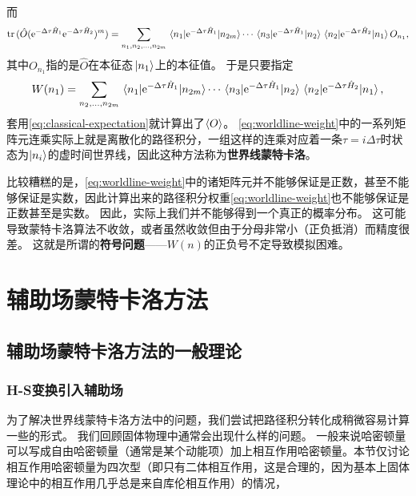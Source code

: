 \documentclass[hyperref, UTF8, a4paper]{ctexart}
\newcommand*{\ee}{\mathrm{e}}
\newcommand*{\concept}[1]{{\textbf{#1}}}
\begin{document}
而
\[
    \trace{(\hat{O} ( \ee^{-\Delta \tau \hat{H}_1} \ee^{- \Delta \tau \hat{H}_2} )^m)} = \sum_{n_1, n_2, \ldots, n_{2m}} \mel{n_1}{\ee^{-\Delta \tau \hat{H}_1}}{n_{2m}} \cdots \mel{n_3}{\ee^{-\Delta \tau \hat{H}_1}}{n_2} \mel{n_2}{\ee^{-\Delta \tau \hat{H}_2}}{n_1} O_{n_1},
\]
其中$O_{n_1}$指的是$\hat{O}$在本征态$\ket*{n_1}$上的本征值。
于是只要指定
\begin{equation}
    W(n_1) = \sum_{n_2, \ldots, n_{2m}} \mel{n_1}{\ee^{-\Delta \tau \hat{H}_1}}{n_{2m}} \cdots \mel{n_3}{\ee^{-\Delta \tau \hat{H}_1}}{n_2} \mel{n_2}{\ee^{-\Delta \tau \hat{H}_2}}{n_1},
    \label{eq:worldline-weight}
\end{equation}
套用\eqref{eq:classical-expectation}就计算出了$\expval{O}$。
\eqref{eq:worldline-weight}中的一系列矩阵元连乘实际上就是离散化的路径积分，一组这样的连乘对应着一条$\tau=i \Delta \tau$时状态为$\ket{n_i}$的虚时间世界线，因此这种方法称为\concept{世界线蒙特卡洛}。


比较糟糕的是，\eqref{eq:worldline-weight}中的诸矩阵元并不能够保证是正数，甚至不能够保证是实数，因此计算出来的路径积分权重\eqref{eq:worldline-weight}也不能够保证是正数甚至是实数。
因此，实际上我们并不能够得到一个真正的概率分布。
这可能导致蒙特卡洛算法不收敛，或者虽然收敛但由于分母非常小（正负抵消）而精度很差。
这就是所谓的\concept{符号问题}——$W(n)$的正负号不定导致模拟困难。

\section{辅助场蒙特卡洛方法}

\subsection{辅助场蒙特卡洛方法的一般理论}

\subsubsection{H-S变换引入辅助场}

为了解决世界线蒙特卡洛方法中的问题，我们尝试把路径积分转化成稍微容易计算一些的形式。
我们回顾固体物理中通常会出现什么样的问题。
一般来说哈密顿量可以写成自由哈密顿量（通常是某个动能项）加上相互作用哈密顿量。本节仅讨论相互作用哈密顿量为四次型（即只有二体相互作用，这是合理的，因为基本上固体理论中的相互作用几乎总是来自库伦相互作用）的情况，
\end{document}
